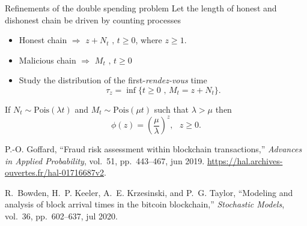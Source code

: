 \documentclass{beamer}
\begin{document}
\begin{frame}{Refinements of the double spending problem}
\scriptsize
Let the length of honest and dishonest chain be driven by counting processes
\begin{itemize}
\item Honest chain $\Rightarrow$ $z+N_t\text{ , }t\geq0$, where $z\geq1$.
\item Malicious chain $\Rightarrow$ $M_t\text{ , }t\geq0$
\item Study the distribution of the first-\textit{rendez-vous} time
$$
\tau_z=\inf\{t\geq0\text{ , } M_t=z+N_t\}.
$$
\end{itemize}
If $N_t\sim\text{Pois}(\lambda t)$ and $M_t\sim\text{Pois}(\mu t)$ such that $\lambda>\mu$ then 
$$
\phi(z) = \left(\frac{\mu}{\lambda}\right)^z,\text{ }z\geq 0.
$$
\tiny
\begin{thebibliography}{1}

P.-O. Goffard, ``Fraud risk assessment within blockchain transactions,'' {\em
  Advances in Applied Probability}, vol.~51, pp.~443--467, jun 2019.
\newblock \url{https://hal.archives-ouvertes.fr/hal-01716687v2}.

R.~Bowden, H.~P. Keeler, A.~E. Krzesinski, and P.~G. Taylor, ``Modeling and
  analysis of block arrival times in the bitcoin blockchain,'' {\em Stochastic
  Models}, vol.~36, pp.~602--637, jul 2020.
\end{thebibliography}

\end{frame}
\end{document}
